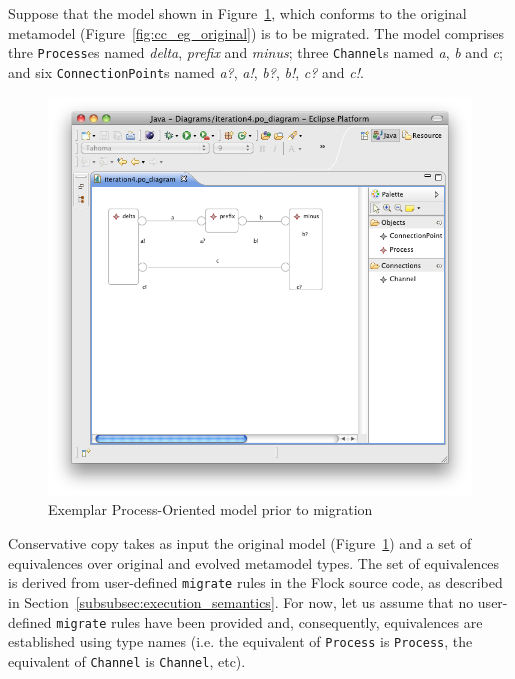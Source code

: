 Suppose that the model shown in Figure~\ref{fig:cc_eg_model}, which conforms to the original metamodel (Figure~\ref{fig:cc_eg_original}) is to be migrated. The model comprises thre \texttt{Pr\-oc\-e\-ss}es named \emph{delta}, \emph{prefix} and \emph{minus}; three \texttt{Ch\-an\-n\-el}s named \emph{a}, \emph{b} and \emph{c}; and six \texttt{Co\-nn\-ec\-ti\-o\-nP\-oi\-nt}s named \emph{a?}, \emph{a!}, \emph{b?}, \emph{b!}, \emph{c?} and \emph{c!}.

\begin{figure}[htbp]
	\centering
		\includegraphics[scale=0.5]{A.2.ProcessOriented/images/4_model.png}
	\caption{Exemplar Process-Oriented model prior to migration}
	\label{fig:cc_eg_model}
\end{figure}

Conservative copy takes as input the original model (Figure~\ref{fig:cc_eg_model}) and a set of equivalences over original and evolved metamodel types. The set of equivalences is derived from user-defined \texttt{mi\-gr\-a\-te} rules in the Flock source code, as described in Section~\ref{subsubsec:execution_semantics}. For now, let us assume that no user-defined \texttt{mi\-gr\-a\-te} rules have been provided and, consequently, equivalences are established using type names (i.e. the equivalent of \texttt{Pr\-oc\-e\-ss} is \texttt{Pr\-oc\-e\-ss}, the equivalent of \texttt{Ch\-an\-n\-el} is \texttt{Ch\-an\-n\-el}, etc).

